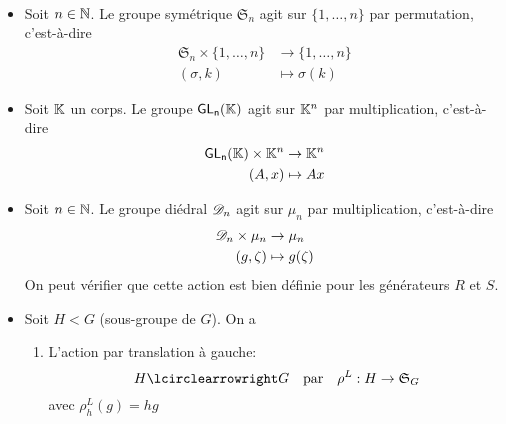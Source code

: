 \begin{example}\,
    \begin{itemize}
        \item Soit \(n\in\mathbb{N}\). Le groupe symétrique \({\mathfrak{S}}_n\) agit sur \(\{1,\ldots,n\}\)
        par permutation, c'est-à-dire
        \begin{equation*}
            \begin{aligned}
                {\mathfrak{S}}_n \times \{1,\ldots,n\} &\to \{1,\ldots,n\}\\
                (\sigma,k) &\mapsto \sigma(k)
            \end{aligned}
        \end{equation*}
        
        \item Soit \(\mathbb{K}\) un corps. Le groupe \(\operatorname{\mathsf{GL_{n}}}(\mathbb{K})\) agit sur \(\mathbb{K}^n\) par multiplication,
        c'est-à-dire
        \begin{equation*}
            \begin{aligned}
                \operatorname{\mathsf{GL_{n}}}(\mathbb{K}) \times \mathbb{K}^n &\to \mathbb{K}^n\\
                (A,x) &\mapsto A x
            \end{aligned}
        \end{equation*}

        \item Soit \(n\in\mathbb{N}\). Le groupe diédral \(\mathscr{D}_n\) agit sur \(\mu_n\) par multiplication,
        c'est-à-dire
        \begin{equation*}
            \begin{aligned}
                \mathscr{D}_n \times \mu_n &\to \mu_n\\
                (g,\zeta) &\mapsto g(\zeta)
            \end{aligned}
        \end{equation*}
        On peut vérifier que cette action est bien définie pour les générateurs \(R\) et \(S\).

        \item Soit \(H < G\) (sous-groupe de \(G\)). On a
        \begin{enumerate}
            \item L'action par translation à gauche:
            \begin{equation*}
                H \act G \quad\text{par}\quad \rho^L : H \to {\mathfrak{S}}_G
            \end{equation*}
            avec \(\rho^L_h(g) = hg\)


\end{enumerate}
\end{itemize}
\end{example}
